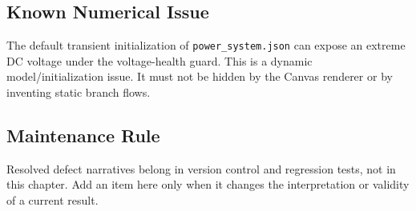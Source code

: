 \subsection{Known Numerical Issue}

The default transient initialization of \texttt{power\_system.json} can expose
an extreme DC voltage under the voltage-health guard. This is a dynamic
model/initialization issue. It must not be hidden by the Canvas renderer or by
inventing static branch flows.

\subsection{Maintenance Rule}

Resolved defect narratives belong in version control and regression tests, not
in this chapter. Add an item here only when it changes the interpretation or
validity of a current result.
